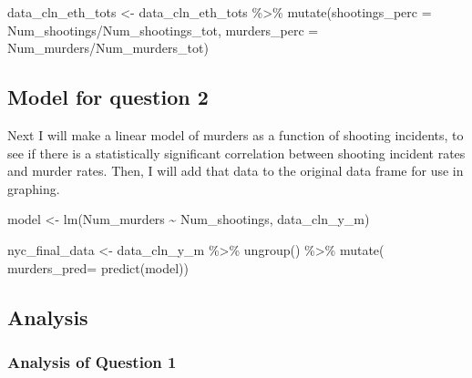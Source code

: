 \documentclass[
]{article}
\newenvironment{Shaded}{\begin{snugshade}}{\end{snugshade}}
\newcommand{\AttributeTok}[1]{\textcolor[rgb]{0.77,0.63,0.00}{#1}}
\newcommand{\FunctionTok}[1]{\textcolor[rgb]{0.00,0.00,0.00}{#1}}
\newcommand{\NormalTok}[1]{#1}
\newcommand{\OtherTok}[1]{\textcolor[rgb]{0.56,0.35,0.01}{#1}}
\newcommand{\SpecialCharTok}[1]{\textcolor[rgb]{0.00,0.00,0.00}{#1}}
\begin{document}
\begin{Shaded}
\begin{Highlighting}[]
\NormalTok{data\_cln\_eth\_tots }\OtherTok{\textless{}{-}}\NormalTok{ data\_cln\_eth\_tots }\SpecialCharTok{\%\textgreater{}\%} \FunctionTok{mutate}\NormalTok{(}\AttributeTok{shootings\_perc =}\NormalTok{ Num\_shootings}\SpecialCharTok{/}\NormalTok{Num\_shootings\_tot, }\AttributeTok{murders\_perc =}\NormalTok{ Num\_murders}\SpecialCharTok{/}\NormalTok{Num\_murders\_tot)}
\end{Highlighting}
\end{Shaded}

\hypertarget{model-for-question-2}{%
\subsection{Model for question 2}\label{model-for-question-2}}

Next I will make a linear model of murders as a function of shooting
incidents, to see if there is a statistically significant correlation
between shooting incident rates and murder rates. Then, I will add that
data to the original data frame for use in graphing.

\begin{Shaded}
\begin{Highlighting}[]
\NormalTok{model }\OtherTok{\textless{}{-}} \FunctionTok{lm}\NormalTok{(Num\_murders }\SpecialCharTok{\textasciitilde{}}\NormalTok{ Num\_shootings, data\_cln\_y\_m)}

\NormalTok{nyc\_final\_data }\OtherTok{\textless{}{-}}\NormalTok{ data\_cln\_y\_m }\SpecialCharTok{\%\textgreater{}\%} \FunctionTok{ungroup}\NormalTok{() }\SpecialCharTok{\%\textgreater{}\%} \FunctionTok{mutate}\NormalTok{( }\AttributeTok{murders\_pred=} \FunctionTok{predict}\NormalTok{(model))}
\end{Highlighting}
\end{Shaded}

\hypertarget{analysis}{%
\subsection{Analysis}\label{analysis}}

\hypertarget{analysis-of-question-1}{%
\subsubsection{Analysis of Question 1}\label{analysis-of-question-1}}
\end{document}
